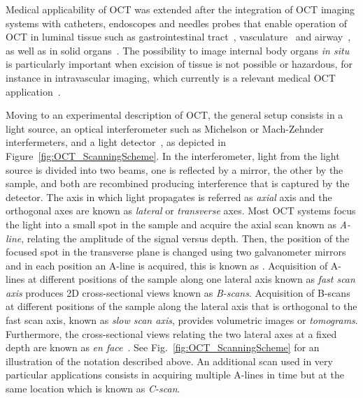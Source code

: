 Medical applicability of OCT was extended after the integration of OCT imaging systems with catheters, endoscopes and needles probes that enable operation of OCT in luminal tissue such as gastrointestinal tract~\cite{Jackle2000_Vivo}, vasculature~\cite{Tearney1996_CatheterBased} and airway~\cite{Armstrong2003_Vivo}, as well as in solid organs~\cite{McLaughlin2012_Imaging}. The possibility to image internal body organs \textit{in situ} is particularly important when excision of tissue is not possible or hazardous, for instance in intravascular imaging, which currently is a relevant medical OCT application~\cite{Bouma2017_Intravascular}.

Moving to an experimental description of OCT, the general setup consists in a light source, an optical interferometer such as Michelson or Mach-Zehnder interfermeters, and a light detector~\cite{Huang1991_Optical}, as depicted in Figure~\ref{fig:OCT_ScanningScheme}. In the interferometer, light from the light source is divided into two beams, one is reflected by a mirror, the other by the sample, and both are recombined producing interference that is captured by the detector. The axis in which light propagates is referred as \textit{axial} axis and the orthogonal axes are known as \textit{lateral} or \textit{transverse} axes. Most OCT systems focus the light into a small spot in the sample and acquire the axial scan known as \textit{A-line}, relating the amplitude of the signal versus depth. Then, the position of the focused spot in the transverse plane is changed using two galvanometer mirrors and in each position an A-line is acquired, this is known as . Acquisition of A-lines at different positions of the sample along one lateral axis known as \textit{fast scan axis} produces 2D cross-sectional views known as \textit{B-scans}. Acquisition of B-scans at different positions of the sample along the lateral axis that is orthogonal to the fast scan axis, known as \textit{slow scan axis}, provides volumetric images or \textit{tomograms}. Furthermore, the cross-sectional views relating the two lateral axes at a fixed depth are known as \textit{en face}~\cite{Fujimoto2015_Introduction}. See Fig.~\ref{fig:OCT_ScanningScheme} for an illustration of the notation described above. An additional scan used in very particular applications consists in acquiring multiple A-lines in time but at the same location which is known as \textit{C-scan}. 


